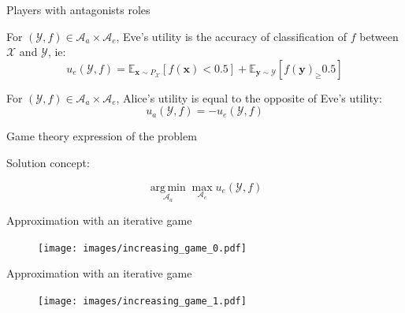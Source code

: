 \documentclass[10pt,aspectratio=169]{beamer}
\DeclareMathOperator*{\argmin}{arg\,min} %
\begin{document}
\begin{frame}{Players with antagonists roles}


\begin{tcolorbox}[colback=lightgreen,colframe=greentheme,title=\textbf{Definition} (Eve's utility)]
For $(\mathcal{Y}, f)  \in \mathcal{A}_a \times \mathcal{A}_e$, Eve's utility is the accuracy of classification of $f$ between $\mathcal{X}$ and $\mathcal{Y}$, ie:
\begin{equation}
    u_e(\mathcal{Y}, f) = \mathbb{E}_{\mathbf{x}\sim P_{\mathcal{X}}}[f(\mathbf{x}) < 0.5] + \mathbb{E}_{\mathbf{y} \sim \mathcal{Y}}[f(\mathbf{y})_ \geq 0.5]
\end{equation}
\end{tcolorbox}


\pause


\begin{tcolorbox}[colback=lightgreen,colframe=greentheme,title=\textbf{Definition} (Alice's utility)]
For $(\mathcal{Y}, f)  \in \mathcal{A}_a \times \mathcal{A}_e$, Alice's utility is equal to the opposite of Eve's utility:
\begin{equation}
    u_a(\mathcal{Y}, f) = - u_e(\mathcal{Y}, f)
\end{equation}
\end{tcolorbox}

\end{frame}

\begin{frame}{Game theory expression of the problem}

Solution concept:

\alert{
    \Large{
        \begin{equation*}
        \underset{\mathcal{A}_a}{\argmin} \max_{\mathcal{A}_e} u_e(\mathcal{Y}, f)
        \end{equation*}
    }
}

\end{frame}

    

\begin{frame}{Approximation with an iterative game}
  \begin{figure}
        \texttt{[image: images/increasing\_game\_0.pdf]}
\end{figure}
\end{frame}

\begin{frame}{Approximation with an iterative game}
  \begin{figure}
        \texttt{[image: images/increasing\_game\_1.pdf]}
\end{figure}
\end{frame}
\end{document}
